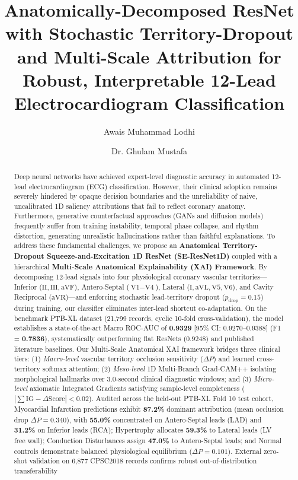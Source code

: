 \documentclass[5p,twocolumn,10pt]{elsarticle}
\begin{document}
\begin{frontmatter}

\title{Anatomically-Decomposed ResNet with Stochastic Territory-Dropout and Multi-Scale Attribution for Robust, Interpretable 12-Lead Electrocardiogram Classification}

\author[1]{Awais Muhammad Lodhi}
\author[1]{Dr. Ghulam Mustafa}

\address[1]{Department of Computer Science, FOIT\&CS, UCP, Pakistan}

\begin{abstract}
Deep neural networks have achieved expert-level diagnostic accuracy in automated 12-lead electrocardiogram (ECG) classification. However, their clinical adoption remains severely hindered by opaque decision boundaries and the unreliability of naive, uncalibrated 1D saliency attributions that fail to reflect coronary anatomy. Furthermore, generative counterfactual approaches (GANs and diffusion models) frequently suffer from training instability, temporal phase collapse, and rhythm distortion, generating unrealistic hallucinations rather than faithful explanations. To address these fundamental challenges, we propose an \textbf{Anatomical Territory-Dropout Squeeze-and-Excitation 1D ResNet (SE-ResNet1D)} coupled with a hierarchical \textbf{Multi-Scale Anatomical Explainability (XAI) Framework}. By decomposing 12-lead signals into four physiological coronary vascular territories---Inferior ($\text{II}, \text{III}, \text{aVF}$), Antero-Septal ($\text{V1}-\text{V4}$), Lateral ($\text{I}, \text{aVL}, \text{V5}, \text{V6}$), and Cavity Reciprocal ($\text{aVR}$)---and enforcing stochastic lead-territory dropout ($p_{\text{drop}} = 0.15$) during training, our classifier eliminates inter-lead shortcut co-adaptation. On the benchmark PTB-XL dataset (21,799 records, cyclic 10-fold cross-validation), the model establishes a state-of-the-art Macro ROC-AUC of \textbf{0.9329} [95\% CI: 0.9270--0.9388] (F1 = \textbf{0.7836}), systematically outperforming flat ResNets ($0.9248$) and published literature baselines. Our Multi-Scale Anatomical XAI framework bridges three clinical tiers: (1) \textit{Macro-level} vascular territory occlusion sensitivity ($\Delta P$) and learned cross-territory softmax attention; (2) \textit{Meso-level} 1D Multi-Branch Grad-CAM++ isolating morphological hallmarks over 3.0-second clinical diagnostic windows; and (3) \textit{Micro-level} axiomatic Integrated Gradients satisfying sample-level completeness ($|\sum \text{IG} - \Delta \text{Score}| < 0.02$). Audited across the held-out PTB-XL Fold 10 test cohort, Myocardial Infarction predictions exhibit \textbf{87.2\%} dominant attribution (mean occlusion drop $\Delta P = 0.340$), with \textbf{55.0\%} concentrated on Antero-Septal leads (LAD) and \textbf{31.2\%} on Inferior leads (RCA); Hypertrophy allocates \textbf{59.3\%} to Lateral leads (LV free wall); Conduction Disturbances assign \textbf{47.0\%} to Antero-Septal leads; and Normal controls demonstrate balanced physiological equilibrium ($\Delta P = 0.101$). External zero-shot validation on 6,877 CPSC2018 records confirms robust out-of-distribution transferability 
\end{abstract}
\end{frontmatter}
\end{document}
